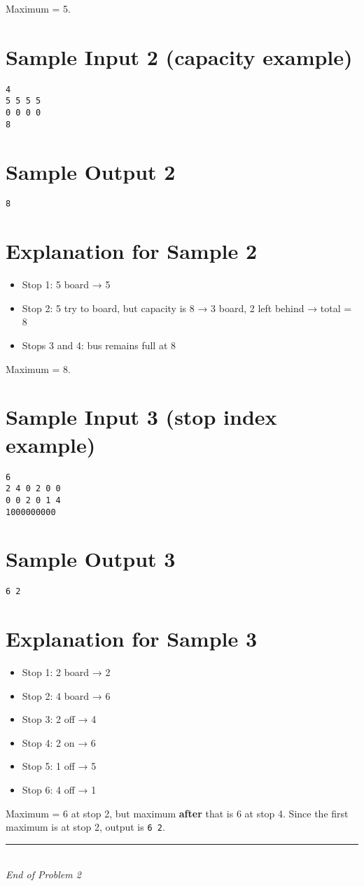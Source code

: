 \documentclass[12pt,a4paper]{article}
\begin{document}
Maximum = 5.

\section*{Sample Input 2 (capacity example)}
\begin{verbatim}
4
5 5 5 5
0 0 0 0
8
\end{verbatim}

\section*{Sample Output 2}
\begin{verbatim}
8
\end{verbatim}

\section*{Explanation for Sample 2}
\begin{itemize}
  \item Stop 1: 5 board → 5  
  \item Stop 2: 5 try to board, but capacity is 8 → 3 board, 2 left behind → total = 8  
  \item Stops 3 and 4: bus remains full at 8  
\end{itemize}

Maximum = 8.

\section*{Sample Input 3 (stop index example)}
\begin{verbatim}
6
2 4 0 2 0 0
0 0 2 0 1 4
1000000000
\end{verbatim}

\section*{Sample Output 3}
\begin{verbatim}
6 2
\end{verbatim}

\section*{Explanation for Sample 3}
\begin{itemize}
  \item Stop 1: 2 board → 2  
  \item Stop 2: 4 board → 6  
  \item Stop 3: 2 off → 4  
  \item Stop 4: 2 on → 6  
  \item Stop 5: 1 off → 5  
  \item Stop 6: 4 off → 1  
\end{itemize}

Maximum = 6 at stop 2, but maximum \textbf{after} that is 6 at stop 4.  
Since the first maximum is at stop 2, output is \texttt{6 2}.  

\vfill
\begin{center}
    \rule{0.8\textwidth}{0.4pt} \\[0.5em]
    \textit{End of Problem 2}
\end{center}
\end{document}
